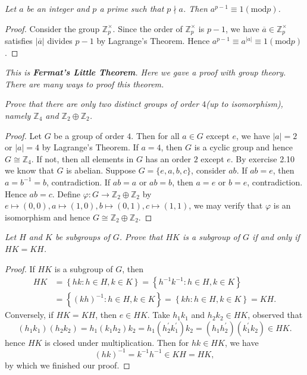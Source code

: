 \begin{problem}\em
Let $a$ be an integer and $p$ a prime such that $p\nmid a$. Then $a^{p-1}\equiv 1(\mathrm{mod}p)$.
\end{problem}
\begin{proof}
Consider the group $\mathbb{Z}_p^\times$. Since the order of $\mathbb{Z}_p^\times$ is $p-1$, we have $\overline{a}\in\mathbb{Z}_p^\times$ satisfies $|\overline{a}|$ divides $p-1$ by Lagrange's Theorem. Hence $a^{p-1}\equiv a^{|a|}\equiv 1(\mathrm{mod}p)$.
\end{proof}
\begin{note}\em
This is \textbf{Fermat's Little Theorem}. Here we gave a proof with group theory. There are many ways to proof this theorem.
\end{note}
\begin{problem}\em
Prove that there are only two distinct groups of order $4$(up to isomorphism), namely $\mathbb{Z}_4$ and $\mathbb{Z}_2\oplus\mathbb{Z}_2$.
\end{problem}
\begin{proof}
Let $G$ be a group of order $4$. Then for all $a\in G$ except $e$, we have $|a|=2$ or $|a|=4$ by Lagrange's Theorem. If $a=4$, then $G$ is a cyclic group and hence $G\cong\mathbb{Z}_4$. If not, then all elements in $G$ has an order $2$ except $e$. By exercise 2.10 we know that $G$ is abelian. Suppose $G=\{e,a,b,c\}$, consider $ab$. If $ab=e$, then $a=b^{-1}=b$, contradiction. If $ab=a$ or $ab=b$, then $a=e$ or $b=e$, contradiction. Hence $ab=c$. Define $\varphi:G\to\mathbb{Z}_2\oplus\mathbb{Z}_2$ by $e\mapsto(0,0),a\mapsto(1,0),b\mapsto(0,1),c\mapsto(1,1)$, we may verify that $\varphi$ is an isomorphism and hence $G\cong\mathbb{Z}_2\oplus\mathbb{Z}_2$.
\end{proof}
\begin{problem}\em
Let $H$ and $K$ be subgroups of $G$. Prove that $HK$ is a subgroup of $G$ if and only if $HK=KH$.
\end{problem}
\begin{proof}
If $HK$ is a subgroup of $G$, then 
$$
\begin{aligned}
HK&=\left\{ hk:h\in H,k\in K \right\} =\left\{ h^{-1}k^{-1}:h\in H,k\in K \right\}\\
&=\left\{ \left( kh \right) ^{-1}:h\in H,k\in K \right\} =\left\{ kh:h\in H,k\in K \right\} =KH.    
\end{aligned}
$$
Conversely, if $HK=KH$, then $e\in HK$. Take $h_1k_1$ and $h_2k_2\in HK$, observed that 
$$
\left( h_1k_1 \right) \left( h_2k_2 \right) =h_1\left( k_1h_2 \right) k_2=h_1\left( h_{2}^{\prime}k_{1}^{\prime} \right) k_2=\left( h_1h_{2}^{\prime} \right) \left( k_{1}^{\prime}k_2 \right) \in HK.
$$
hence $HK$ is closed under multiplication. Then for $hk\in HK$, we have 
$$
\left( hk \right) ^{-1}=k^{-1}h^{-1}\in KH=HK,
$$
by which we finished our proof.
\end{proof}
